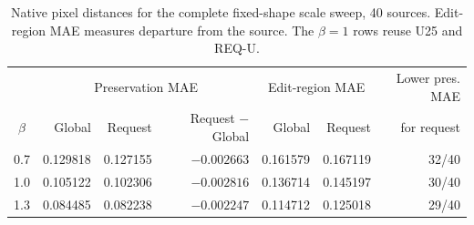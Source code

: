 \begin{table}[!t]
\centering\footnotesize
\caption{Native pixel distances for the complete fixed-shape scale sweep, 40 sources. Edit-region MAE measures departure from the source. The $\beta=1$ rows reuse U25 and REQ-U.}
\label{tab:beta}
\begin{tabular}{crrrrrr}
\toprule
 & \multicolumn{3}{c}{Preservation MAE} & \multicolumn{2}{c}{Edit-region MAE} & Lower pres. MAE\\
$\beta$ & Global & Request & Request $-$ Global & Global & Request & for request\\
\midrule
0.7 & 0.129818 & 0.127155 & $-0.002663$ & 0.161579 & 0.167119 & 32/40 \\
1.0 & 0.105122 & 0.102306 & $-0.002816$ & 0.136714 & 0.145197 & 30/40 \\
1.3 & 0.084485 & 0.082238 & $-0.002247$ & 0.114712 & 0.125018 & 29/40 \\
\bottomrule
\end{tabular}
\end{table}
